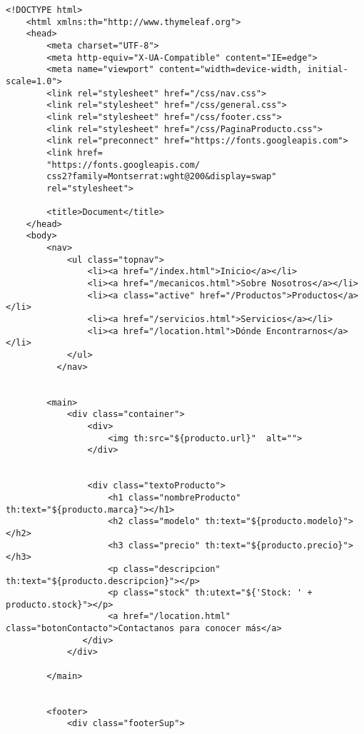 \begin{lstlisting}[caption=PaginaProducto.html (LMSI)]
    <!DOCTYPE html>
    <html xmlns:th="http://www.thymeleaf.org">
    <head>
        <meta charset="UTF-8">
        <meta http-equiv="X-UA-Compatible" content="IE=edge">
        <meta name="viewport" content="width=device-width, initial-scale=1.0">
        <link rel="stylesheet" href="/css/nav.css">
        <link rel="stylesheet" href="/css/general.css">
        <link rel="stylesheet" href="/css/footer.css">
        <link rel="stylesheet" href="/css/PaginaProducto.css">
        <link rel="preconnect" href="https://fonts.googleapis.com">
        <link href=
        "https://fonts.googleapis.com/
        css2?family=Montserrat:wght@200&display=swap"
        rel="stylesheet">
    
        <title>Document</title>
    </head>
    <body>
        <nav>
            <ul class="topnav">
                <li><a href="/index.html">Inicio</a></li>
                <li><a href="/mecanicos.html">Sobre Nosotros</a></li>
                <li><a class="active" href="/Productos">Productos</a></li>
                <li><a href="/servicios.html">Servicios</a></li>
                <li><a href="/location.html">Dónde Encontrarnos</a></li>
            </ul>
          </nav>
    
    
        <main>
            <div class="container">
                <div>
                    <img th:src="${producto.url}"  alt="">
                </div>
                
        
                <div class="textoProducto">
                    <h1 class="nombreProducto" th:text="${producto.marca}"></h1>
                    <h2 class="modelo" th:text="${producto.modelo}"></h2>
                    <h3 class="precio" th:text="${producto.precio}"></h3>
                    <p class="descripcion" th:text="${producto.descripcion}"></p>
                    <p class="stock" th:utext="${'Stock: ' + producto.stock}"></p>
                    <a href="/location.html" class="botonContacto">Contactanos para conocer más</a>
               </div>
            </div>
            
        </main>
    
    
        <footer>
            <div class="footerSup">
    

\end{lstlisting}
